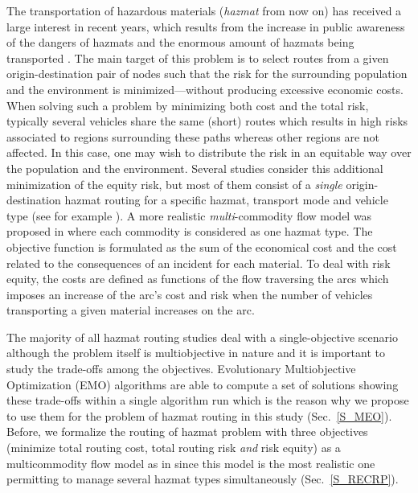 \documentclass[preprint,12pt]{elsarticle}
\begin{document}
The transportation of hazardous materials ({\em hazmat} from now on) has received a large interest in recent years, which results from the increase in public awareness of the dangers of hazmats and the enormous amount of hazmats being transported \cite{CAR08}. The main target of this problem is to select routes from a given origin-destination pair of nodes such that the risk for the surrounding population and the environment is minimized---without producing excessive economic costs. 
%
When solving such a problem by minimizing both cost and the total risk, typically several vehicles share the same (short) routes which results in high risks associated to regions surrounding these paths whereas other regions are not affected. In this case, one may wish to distribute the risk in an equitable way over the population and the environment. Several studies consider this additional minimization of the equity risk, but most of them consist of a \emph{single} origin-destination hazmat routing for a specific hazmat, transport mode and vehicle type (see for example \cite{AKG02, CAR08}).
% 
% 
%
A more realistic \emph{multi}-commodity flow model was proposed in \citep{CAR08} where each commodity is considered as one hazmat type. The objective function is formulated as the sum of the economical cost and the cost related to the consequences of an incident for each material. To deal with risk equity, the costs are defined as functions of the flow traversing the arcs which imposes an increase of the arc's cost and risk when the number of vehicles transporting a given material increases on the arc.

The majority of all hazmat routing studies deal with a single-objective scenario although the problem itself is multiobjective in nature and it is important to study the trade-offs among the objectives. Evolutionary Multiobjective Optimization (EMO) algorithms are able to compute a set of solutions showing these trade-offs within a single algorithm run which is the reason why we propose to use them for the problem of hazmat routing in this study (Sec.~\ref{S_MEO}). Before, we formalize the routing of hazmat problem with three objectives (minimize total routing cost, total routing risk {\em and} risk equity) as a multicommodity flow model as in \cite{CAR08} since this model is the most realistic one permitting to manage several hazmat types simultaneously (Sec.~\ref{S_RECRP}).
\end{document}
